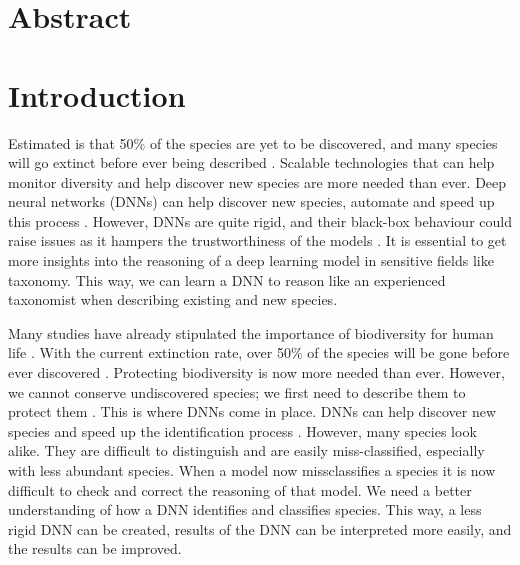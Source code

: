 \documentclass[a4paper, 12pt, oneside]{book} %
\begin{document}
\newpage
\thispagestyle{empty}
\section*{Abstract}
\newpage

\thispagestyle{empty}
\tableofcontents
\thispagestyle{empty}
\listoffigures
\thispagestyle{empty}
\listoftables
\thispagestyle{empty}
\newpage



\renewcommand{\thesection}{\arabic{section}}
\section{Introduction}

Estimated is that 50\% of the species are yet to be discovered, and many species will go extinct before ever being described \autocite{lees_species_2015}.
Scalable technologies that can help monitor diversity and help discover new species are more needed than ever.
Deep neural networks (DNNs) can help discover new species, automate and speed up this process \autocite{van_horn_inaturalist_2018}.
However, DNNs are quite rigid, and their black-box behaviour could raise issues as it hampers the trustworthiness of the models \autocite{carvalho_machine_2019}.
It is essential to get more insights into the reasoning of a deep learning model in sensitive fields like taxonomy.
This way, we can learn a DNN to reason like an experienced taxonomist when describing existing and new species.

Many studies have already stipulated the importance of biodiversity for human life \autocite{pimentel_economic_1997, gowdy_value_1997, raffaelli_links_2010, joppa_biodiversity_2011, pimm_how_2018}.
With the current extinction rate, over 50\% of the species will be gone before ever discovered \autocite{lees_species_2015}.
Protecting biodiversity is now more needed than ever.
However, we cannot conserve undiscovered species; we first need to describe them to protect them \autocite{joppa_biodiversity_2011}.
This is where DNNs come in place.
DNNs can help discover new species and speed up the identification process \autocite{van_horn_inaturalist_2018}.
However, many species look alike.
They are difficult to distinguish and are easily miss-classified, especially with less abundant species.
When a model now missclassifies a species it is now difficult to check and correct the reasoning of that model.
We need a better understanding of how a DNN identifies and classifies species. 
This way, a less rigid DNN can be created, results of the DNN can be interpreted more easily, and the results can be improved.
\end{document}
